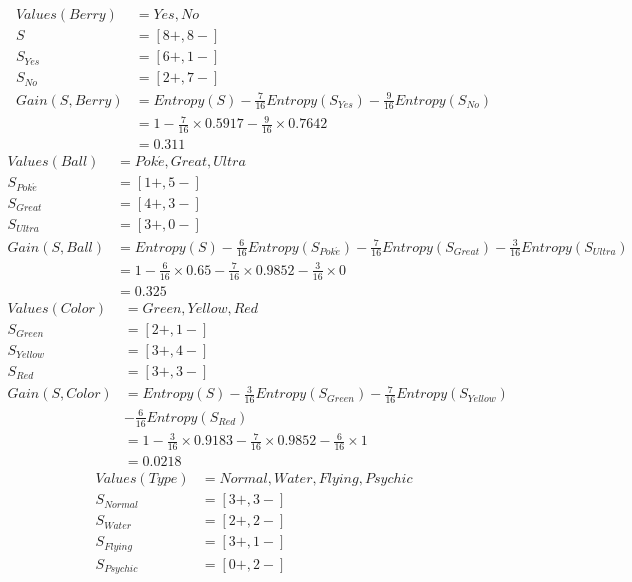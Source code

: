\begin{enumerate}
\begin{enumerate}
\begin{align*} 
Values(Berry) &= Yes , No\\
S &= \left [ 8+, 8- \right ] \\
S_{Yes} &= \left [ 6+, 1- \right ] \\
S_{No} &= \left [ 2+, 7- \right ] \\
Gain(S , Berry) &= Entropy(S) - \frac{7}{16} Entropy(S_{Yes}) - \frac{9}{16} Entropy(S_{No})\\
&= 1 - \frac{7}{16} \times 0.5917 - \frac{9}{16} \times 0.7642\\
&= 0.311
\end{align*}
\begin{align*} 
Values(Ball) &= Pok \acute e , Great , Ultra\\
S_{Pok \acute e} &= \left [ 1+, 5- \right ] \\
S_{Great} &= \left [ 4+, 3- \right ] \\
S_{Ultra} &= \left [ 3+, 0- \right ] \\
Gain(S , Ball) &= Entropy(S) - \frac{6}{16} Entropy(S_{Pok \acute e}) - \frac{7}{16} Entropy(S_{Great}) - \frac{3}{16} Entropy(S_{Ultra})\\
&= 1 - \frac{6}{16} \times 0.65 - \frac{7}{16} \times 0.9852 -\frac{3}{16} \times 0\\
&= 0.325
\end{align*}
\begin{align*} 
Values(Color) &= Green , Yellow , Red\\
S_{Green} &= \left [ 2+, 1- \right ] \\
S_{Yellow} &= \left [ 3+, 4- \right ] \\
S_{Red} &= \left [ 3+, 3- \right ] \\
Gain(S , Color) &= Entropy(S) - \frac{3}{16} Entropy(S_{Green}) - \frac{7}{16} Entropy(S_{Yellow}) \\ 
&- \frac{6}{16} Entropy(S_{Red})\\
&= 1 - \frac{3}{16} \times 0.9183 - \frac{7}{16} \times 0.9852 -\frac{6}{16} \times 1\\
&= 0.0218
\end{align*}
\begin{align*} 
Values(Type) &= Normal , Water , Flying, Psychic\\
S_{Normal} &= \left [ 3+, 3- \right ] \\
S_{Water} &= \left [ 2+, 2- \right ] \\
S_{Flying} &= \left [ 3+, 1- \right ] \\
S_{Psychic} &= \left [ 0+, 2- \right ] \\

\end{align*}
\end{enumerate}
\end{enumerate}
